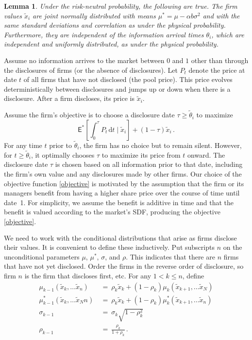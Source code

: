 \documentclass[authoryear,letterpaper,english,12pt]{elsarticle}
\theoremstyle{plain}
\newtheorem{lemma}{Lemma}
\numberwithin{lemma}{section}
\numberwithin{proposition}{section}
\numberwithin{equation}{section}
\numberwithin{figure}{section}
\newcommand{\D}{\mathrm{d}}
\newcommand{\mye}{\ensuremath{\mathsf{E}}}
\begin{document}
\begin{lemma}\label{lemma:riskneutral}
Under the risk-neutral probability, the following are true.  The firm values $\tilde x_i$ are joint normally distributed with means $\mu^*  = \mu  - \alpha b\sigma^2$ and with the same standard deviations and correlation as under the physical probability.  Furthermore, they are independent of the information arrival times $\theta_i$, which are independent and uniformly distributed, as under the physical probability.
\end{lemma}  

Assume no information arrives to the market between $0$ and $1$ other than through the disclosures of firms (or the absence of disclosures).  Let $P_t$ denote the price at date $t$ of all firms that have not disclosed (the pool price).  This price evolves deterministically between disclosures and jumps up or down when there is a disclosure.  After a firm discloses, its price is $\tilde x_i$.  

Assume the firm's objective is to choose a disclosure date $\tau \ge \tilde \theta_i$ to maximize
\begin{equation}\label{objective}
 \mye^* \left[\int_0^\tau P_t \,\D t \mid \tilde x_i \right]  + (1-\tau)\tilde x_i \,.
\end{equation}
For any time $t$ prior to $\tilde \theta_i$, the firm has no choice but to remain silent. However, for $t \geq \tilde \theta_i$, it optimally chooses $\tau$ to maximize its price from $t$ onward. The disclosure date $\tau$ is chosen based on all information prior to that date, including the firm's own value and any disclosures made by other firms. Our choice of the objective function \eqref{objective} is motivated by the assumption that the firm or its managers benefit from having a higher share price over the course of time until date~1. For simplicity, we assume the benefit is additive in time and that the benefit is valued according to the market's SDF, producing the objective \eqref{objective}.

We need to work with the conditional distributions that arise as firms disclose their values.  It is convenient to define these inductively.  Put subscripts $n$ on the unconditional parameters $\mu$, $\mu^*$, $\sigma$, and $\rho$.  This indicates that there are $n$ firms that have not yet disclosed.  Order the firms in the reverse order of disclosure, so firm $n$ is the firm that discloses first, etc.  For any $1< k \le n$, define
\begin{subequations}\label{parameter_recursion}
\begin{align}
\mu_{k-1}(\tilde x_k, \ldots \tilde x_n) \ & = \ \rho_{k} \tilde x_{k} + (1-\rho_{k})\mu_{k}(\tilde x_{k+1},\ldots \tilde x_{N})\\
\mu^*_{k-1}(\tilde x_k, \ldots \tilde x_Nn) \ & = \ \rho_{k} \tilde x_k + (1-\rho_{k})\mu^*_{k}(\tilde x_{k+1}, \ldots \tilde x_{n})\\
\sigma_{k-1} \ & = \ \sigma_{k}\sqrt{1-\rho_{k}^2}\\
\rho_{k-1} \ & = \ \frac{\rho_{k}}{1+\rho_{k}}\,. \label{rhon}
\end{align}
\end{subequations}
\end{document}
